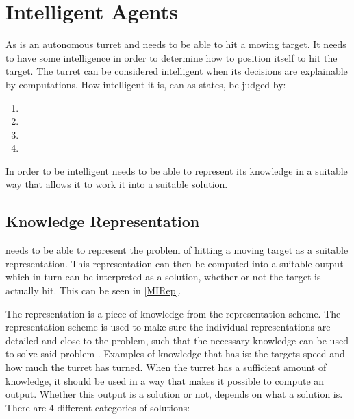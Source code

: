 \section{Intelligent Agents}
 
As \name is an autonomous turret and needs to be able to hit a moving target.
It needs to have some intelligence in order to determine how to position itself
to hit the target. The turret can be considered intelligent when its decisions
are explainable by computations. How intelligent it is, can as
\citep[ch.1.1,p.4]{MIBook} states, be judged by:

\begin{enumerate}
  
  \item {}
  \item {}
  \item {}
  \item {}
\end{enumerate}

In order to be intelligent \name needs to be able to represent its
knowledge in a suitable way that allows it to work it into a suitable solution. 

\subsection{Knowledge Representation}\label{KR}

\name needs to be able to represent the problem of hitting a
moving target as a suitable representation. This representation can then be
computed into a suitable output which in turn can be interpreted as
a solution, whether or not the target is actually hit. This can be seen in
\autoref{MIRep}.


The representation is a piece of knowledge from the representation
scheme. The representation scheme is used to make sure the individual
representations are detailed and close to the problem, such that the necessary
knowledge can be used to solve said problem .
Examples of knowledge that \name has is: the targets speed and how much the turret has
turned. When the turret has a sufficient amount of knowledge, it should be used
in a way that makes it possible to compute an output. Whether this output is a
solution or not, depends on what a solution is. There are 4 different categories
of solutions:

